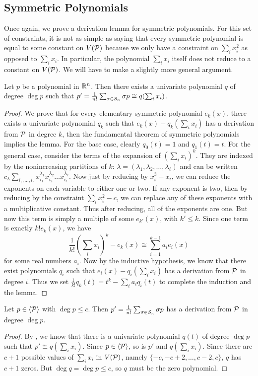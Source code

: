 \subsection{Symmetric Polynomials}
Once again, we prove a derivation lemma for symmetric polynomials. For this set of constraints, it is not as simple as saying that every symmetric polynomial is equal to some constant on $V(\mathcal P)$ because we only have a constraint on $\sum_i x_i^2$ as opposed to $\sum_i x_i$. In particular, the polynomial $\sum_i x_i$ itself does not reduce to a constant on $V(\mathcal P)$. We will have to make a slightly more general argument.
\begin{lemma}\label{lem:bpca-symmetric}
Let $p$ be a polynomial in $\mathbb R^n$. Then there exists a univariate polynomial $q$ of degree $\deg p$ such that $p' = \frac{1}{n!}\sum_{\sigma \in \mathcal S_n} \sigma p \cong q(\sum_i x_i)$.
\end{lemma}
\begin{proof}
We prove that for every elementary symmetric polynomial $e_k(x)$, there exists a univariate polynomial $q_k$ such that $e_k(x) - q_k(\sum_i x_i)$ has a derivation from $\mathcal P$ in degree $k$, then the fundamental theorem of symmetric polynomials implies the lemma. For the base case, clearly $q_0(t) = 1$ and $q_1(t) = t$. For the general case, consider the terms of the expansion of $\left(\sum_i x_i\right)^k$. They are indexed by the nonincreasing partitions of $k$: $\lambda = (\lambda_1, \lambda_2, \dots, \lambda_\ell)$ and can be written $c_\lambda \sum_{i_1,\dots,i_\ell} x_{i_1}^{\lambda_1} x_{i_2}^{\lambda_2} \dots x_{i_\ell}^{\lambda_\ell}$. Now just by reducing by $x_i^3 - x_i$, we can reduce the exponents on each variable to either one or two. If any exponent is two, then by reducing by the constraint $\sum_i x_i^2 - c$, we can replace any of these exponents with a multiplicative constant. Thus after reducing, all of the exponents are one. But now this term is simply a multiple of some $e_{k'}(x)$, with $k' \leq k$. Since one term is exactly $k!e_k(x)$, we have
\[\frac{1}{k!}\left(\sum_i x_i\right)^k - e_k(x) \cong \sum_{i=1}^{k-1} a_i e_i(x)\]
for some real numbers $a_i$. Now by the inductive hypothesis, we know that there exist polynomials $q_i$ such that $e_i(x) - q_i(\sum_i x_i)$ has a derivation from $\mathcal P$ in degree $i$. Thus we set $\frac{1}{k!}q_k(t) = t^k - \sum_i a_i q_i(t)$ to complete the induction and the lemma.
\end{proof}
\begin{corollary}
Let $p \in \langle \mathcal P \rangle$ with $\deg p \leq c$. Then $p' = \frac{1}{n!}\sum_{\sigma \in \mathcal S_n} \sigma p$ has a derivation from $\mathcal P$ in degree $\deg p$. 
\end{corollary}
\begin{proof}
By , we know that there is a univariate polynomial $q(t)$ of degree $\deg p$ such that $p' \cong q(\sum_i x_i)$. Since $p \in \langle \mathcal P \rangle$, so is $p'$ and $q(\sum_i x_i)$. Since there are $c+1$ possible values of $\sum_i x_i$ in $V(\mathcal P)$, namely $\{-c, -c+2, \dots, c-2, c\}$, $q$ has $c+1$ zeros. But $\deg q = \deg p \leq c$, so $q$ must be the zero polynomial.
\end{proof}

